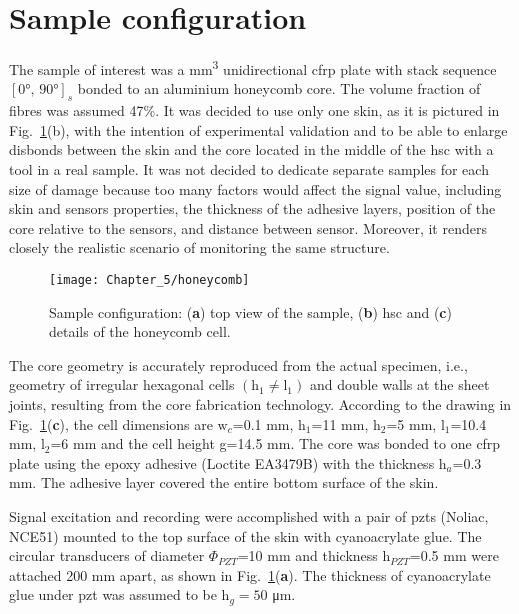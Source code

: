 \section{Sample configuration}
\label{sec:sample}

The sample of interest was a  \unit{\cubic\mm} unidirectional \ac{cfrp} plate with stack sequence \(\left[\ang{0},\,\ang{90}\right]_s\) bonded to an aluminium honeycomb core. The volume fraction of fibres was assumed 47\%.
It was decided to use only one skin, as it is pictured in Fig.~\ref{fig:honeycomb}(b), with the intention of experimental validation and to be able to enlarge disbonds between the skin and the core located in the middle of the \ac{hsc} with a tool in a real sample. 
It was not decided to dedicate separate samples for each size of damage because too many factors would affect the signal value, including skin and sensors properties, the thickness of the adhesive layers, position of the core relative to the sensors, and distance between sensor.
Moreover, it renders closely the realistic scenario of monitoring the same structure.
\begin{figure}[H]
	\begin{center}
		\texttt{[image: Chapter\_5/honeycomb]}
	\end{center}
	\caption{Sample configuration: (\textbf{a}) top view of the sample, (\textbf{b}) \acf{hsc} and (\textbf{c}) details of the honeycomb cell.}
	\label{fig:honeycomb}
\end{figure}

The core geometry is accurately reproduced from the actual specimen, i.e., geometry of irregular hexagonal cells \(\left(\mathrm{h}_1 \ne \mathrm{l}_1\right)\) and double walls at the sheet joints, resulting from the core fabrication technology.
According to the drawing in Fig.~\ref{fig:honeycomb}(\textbf{c}), the cell dimensions are \(\mathrm{w}_c\)=0.1 \unit{\mm}, h\(_1\)=11 \unit{\mm}, h\(_2\)=5 \unit{\mm}, l\(_1\)=10.4 \unit{\mm}, l\(_2\)=6 \unit{\mm} and the cell height g=14.5 \unit{\mm}.
The core was bonded to one \ac{cfrp} plate using the epoxy adhesive (Loctite EA3479B) with the thickness h\(_a\)=0.3 \unit{\mm}.
The adhesive layer covered the entire bottom surface of the skin.

Signal excitation and recording were accomplished with a pair of \acp{pzt}  (Noliac, NCE51) mounted to the top surface of the skin with cyanoacrylate glue.
The circular transducers of diameter \(\Phi_{PZT}\)=10 \unit{\mm} and thickness h\(_{PZT}\)=0.5 \unit{\mm} were attached 200 \unit{\mm} apart, as shown in Fig.~\ref{fig:honeycomb}(\textbf{a}).
The thickness of cyanoacrylate glue under \ac{pzt} was assumed to be h\(_g=50\) \unit{\micro\m}.

